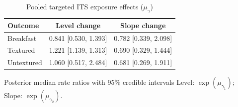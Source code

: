\begin{table}[H]
\centering
\caption{Pooled targeted ITS exposure effects ($\mu_\gamma$)}
\label{tab:a4_mu_gamma}
\begin{tabular}{lcc}
\toprule
Outcome & Level change & Slope change \\
\midrule
Breakfast & 0.841 [0.530, 1.393] & 0.782 [0.339, 2.098] \\
Textured & 1.221 [1.139, 1.313] & 0.690 [0.329, 1.444] \\
Untextured & 1.060 [0.517, 2.484] & 0.681 [0.269, 1.911] \\
\bottomrule
\end{tabular}
\par\smallskip\footnotesize Posterior median rate ratios with 95\% credible intervals Level: $\exp(\mu_{\gamma_1})$; Slope: $\exp(\mu_{\gamma_2})$.
\end{table}
